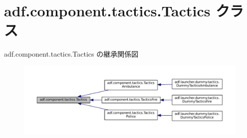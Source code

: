 \hypertarget{classadf_1_1component_1_1tactics_1_1Tactics}{}\section{adf.\+component.\+tactics.\+Tactics クラス}
\label{classadf_1_1component_1_1tactics_1_1Tactics}


adf.\+component.\+tactics.\+Tactics の継承関係図
\nopagebreak
\begin{figure}[H]
\begin{center}
\leavevmode
\includegraphics[width=350pt]{classadf_1_1component_1_1tactics_1_1Tactics__inherit__graph}
\end{center}
\end{figure}
